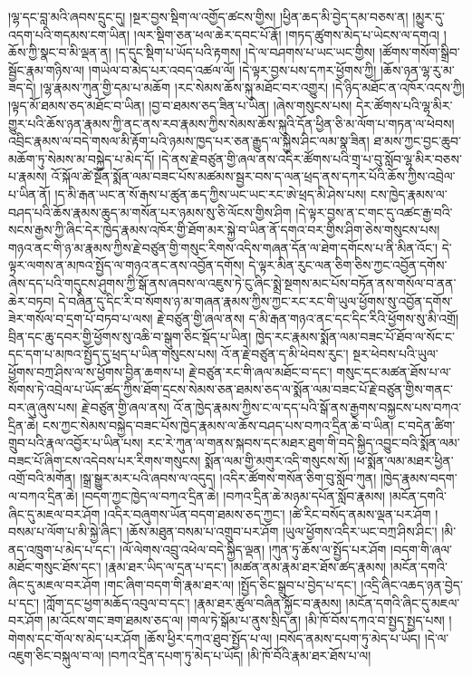 \documentclass{article}
\begin{document}
།ལྷ་དང་བླ་མའི་ཞབས་དྲུང་དུ། །སྔར་བྱས་སྡིག་ལ་འགྱོད་ཚངས་གྱིས། །ཕྱིན་ཆད་མི་བྱེད་དམ་བཅས་ན། །མྱུར་དུ་འདག་པའི་གདམས་ངག་ཡིན། །ལར་སྡིག་ཅན་ཕལ་ཆེར་དབང་པོ་རྣོ། །གཏད་ཚུགས་མེད་པ་ཡེངས་ལ་དགའ། །ཆོས་ཀྱི་སྣང་བ་མི་ལྡན་ན། །ད་དུང་སྡིག་པ་ཡོད་པའི་རྟགས། །དེ་ལ་བཤགས་པ་ཡང་ཡང་གྱིས། །ཚོགས་གསོག་སྒྲིབ་སྦྱོང་རྣམ་གཉིས་ལ། །གཡེལ་བ་མེད་པར་འབད་འཚལ་ལོ། །དེ་ལྟར་བྱས་པས་དཀར་ཕྱོགས་ཀྱི། །ཆོས་ཉན་ལྷ་རུ་མ་ཟད་དེ། །ལྷ་རྣམས་ཀུན་གྱི་དམ་པ་མཆོག །རང་སེམས་ཆོས་སྐུ་མཐོང་བར་འགྱུར། །དེ་ཉིད་མཐོང་ན་འཁོར་འདས་ཀྱི། །ལྟད་མོ་ཐམས་ཅད་མཐོང་བ་ཡིན། །བྱ་བ་ཐམས་ཅད་ཟིན་པ་ཡིན། །ཞེས་གསུངས་པས། དེར་ཚོགས་པའི་ལྷ་མིར་གྱུར་པའི་ཆོས་ཉན་རྣམས་ཀྱི་ནང་ནས་རབ་རྣམས་ཀྱིས་སེམས་ཆོས་སྐུའི་དོན་ཕྱིན་ཅི་མ་ལོག་པ་གཏན་ལ་ཕེབས། འབྲིང་རྣམས་ལ་བདེ་གསལ་མི་རྟོག་པའི་ཉམས་ཁྱད་པར་ཅན་རྒྱུད་ལ་སྐྱེས་ཤིང་ལམ་སྣ་ཟིན། ཐ་མས་ཀྱང་བྱང་ཆུབ་མཆོག་ཏུ་སེམས་མ་བསྐྱེད་པ་མེད་དོ། །དེ་ནས་རྗེ་བཙུན་གྱི་ཞལ་ནས་འདིར་ཚོགས་པའི་གྲྭ་པ་བུ་སློབ་ལྷ་མིར་བཅས་པ་རྣམས། འོ་སྐོལ་ཚེ་སྔོན་སྨོན་ལམ་བཟང་པོས་མཚམས་སྦྱར་བས་ད་ལན་ཕྲད་ནས་དཀར་པོའི་ཆོས་ཀྱིས་འབྲེལ་པ་ཡིན་ནོ། །ད་མི་རྒན་ཡང་ན་སོ་རྒས་པ་ཚུན་ཆད་ཀྱིས་ཡང་ཡང་རང་ཨེ་ཕྲད་མི་ཤེས་པས། ངས་ཁྱེད་རྣམས་ལ་བཤད་པའི་ཆོས་རྣམས་ཆུད་མ་གསོན་པར་ཉམས་སུ་ཅི་ལོངས་གྱིས་ཤིག །དེ་ལྟར་བྱས་ན་ང་གང་དུ་འཚང་རྒྱ་བའི་སངས་རྒྱས་ཀྱི་ཞིང་དེར་ཁྱེད་རྣམས་འཁོར་གྱི་ཐོག་མར་སྐྱེ་བ་ཡིན་ནོ་དགའ་བར་གྱིས་ཤིག་ཅེས་གསུངས་པས། གཉའ་ནང་གི་ཉ་མ་རྣམས་ཀྱིས་རྗེ་བཙུན་གྱི་གསུང་རིགས་འདིས་གཞན་དོན་ལ་ཐེག་དགོངས་པ་ནི་མིན་འོང་། དེ་ལྟར་ལགས་ན་མཁའ་སྤྱོད་ལ་གཉའ་ནང་ནས་འབྱོན་དགོས། དེ་ལྟར་མིན་རུང་ལན་ཅིག་ཅིས་ཀྱང་འབྱོན་དགོས་ཞེས་དད་པའི་གདུངས་ཤུགས་ཀྱི་སྒོ་ནས་ཞབས་ལ་འཇུས་ཏེ་ངུ་ཞིང་སྨྲེ་སྔགས་མང་པོས་བཏོན་ནས་གསོལ་བ་ནན་ཆེར་བཏབ། དེ་བཞིན་དུ་དིང་རི་བ་སོགས་ཉ་མ་གཞན་རྣམས་ཀྱིས་ཀྱང་རང་རང་གི་ཡུལ་ཕྱོགས་སུ་འབྱོན་དགོས་ཟེར་གསོལ་བ་དྲག་པོ་བཏབ་པ་ལས། རྗེ་བཙུན་གྱི་ཞལ་ནས། ད་མི་རྒན་གཉའ་ནང་དང་དིང་རིའི་ཕྱོགས་སུ་མི་འགྲོ། བྲིན་དང་ཆུ་དབར་གྱི་ཕྱོགས་སུ་འཆི་བ་སྒུག་ཅིང་སྡོད་པ་ཡིན། ཁྱེད་རང་རྣམས་སྨོན་ལམ་བཟང་པོ་ཐོབ་ལ་སོང་ང་དང་དག་པ་མཁའ་སྤྱོད་དུ་ཕྲད་པ་ཡིན་གསུངས་པས། འོ་ན་རྗེ་བཙུན་ད་མི་ཕེབས་རུང་། སྔར་ཕེབས་པའི་ཡུལ་ཕྱོགས་བཀྲ་ཤིས་ལ་ས་ཕྱོགས་བྱིན་ཆགས་པ། རྗེ་བཙུན་རང་གི་ཞལ་མཐོང་བ་དང་། གསུང་དང་མཚན་ཐོས་པ་ལ་སོགས་ཏེ་འབྲེལ་པ་ཡོད་ཚད་ཀྱིས་ཐོག་དྲངས་སེམས་ཅན་ཐམས་ཅད་ལ་སྨོན་ལམ་བཟང་པོ་རྗེ་བཙུན་གྱིས་གནང་བར་ཞུ་ཞུས་པས། རྗེ་བཙུན་གྱི་ཞལ་ནས། འོ་ན་ཁྱེད་རྣམས་ཀྱིས་ང་ལ་དད་པའི་སྒོ་ནས་རྒྱགས་བསྐྱངས་པས་བཀའ་དྲིན་ཆེ། ངས་ཀྱང་སེམས་བསྐྱེད་བཟང་པོས་ཁྱེད་རྣམས་ལ་ཆོས་བཤད་པས་བཀའ་དྲིན་ཆེ་བ་ཡིན། ང་བདེན་ཚིག་གྲུབ་པའི་རྣལ་འབྱོར་པ་ཡིན་པས། རང་རེ་ཀུན་ལ་གནས་སྐབས་དང་མཐར་ཐུག་གི་བདེ་སྐྱིད་འབྱུང་བའི་སྨོན་ལམ་བཟང་པོ་ཞིག་ངས་འདེབས་པར་རིགས་གསུངས། སྨོན་ལམ་གྱི་མགུར་འདི་གསུངས་སོ། །ཕ་སྨོན་ལམ་མཐར་ཕྱིན་འགྲོ་བའི་མགོན། །སྒྲ་སྒྱུར་མར་པའི་ཞབས་ལ་འདུད། །འདིར་ཚོགས་གསོན་ཅིག་བུ་སློབ་ཀུན། །ཁྱེད་རྣམས་བདག་ལ་བཀའ་དྲིན་ཆེ། །བདག་ཀྱང་ཁྱེད་ལ་བཀའ་དྲིན་ཆེ། །བཀའ་དྲིན་ཆེ་མཉམ་དཔོན་སློབ་རྣམས། །མངོན་དགའི་ཞིང་དུ་མཇལ་བར་ཤོག །འདིར་བཞུགས་ཡོན་བདག་ཐམས་ཅད་ཀྱང་། །ཚེ་རིང་བསོད་ནམས་ལྡན་པར་ཤོག །བསམ་པ་ལོག་པ་མི་སྐྱེ་ཞིང་། །ཆོས་མཐུན་བསམ་པ་འགྲུབ་པར་ཤོག །ཡུལ་ཕྱོགས་འདིར་ཡང་བཀྲ་ཤིས་ཤིང་། །མི་ནད་འཁྲུག་པ་མེད་པ་དང་། །ལོ་ལེགས་འབྲུ་འཕེལ་བདེ་སྐྱིད་ལྡན། །ཀུན་ཏུ་ཆོས་ལ་སྤྱོད་པར་ཤོག །བདག་གི་ཞལ་མཐོང་གསུང་ཐོས་དང་། །རྣམ་ཐར་ཡིད་ལ་དྲན་པ་དང་། །མཚན་ནམ་རྣམ་ཐར་ཐོས་ཚད་རྣམས། །མངོན་དགའི་ཞིང་དུ་མཇལ་བར་ཤོག །གང་ཞིག་བདག་གི་རྣམ་ཐར་ལ། །སྤྱོད་ཅིང་སྒྲུབ་པ་བྱེད་པ་དང་། །འདྲི་ཞིང་འཆད་ཉན་བྱེད་པ་དང་། །ཀློག་དང་ཕྱག་མཆོད་འབུལ་བ་དང་། །རྣམ་ཐར་ཚུལ་བཞིན་སྐྱོང་བ་རྣམས། །མངོན་དགའི་ཞིང་དུ་མཇལ་བར་ཤོག །མ་འོངས་གང་ཟག་ཐམས་ཅད་ལ། །གལ་ཏེ་སྒོམ་པ་ནུས་སྲིད་ན། །མི་ཁོ་བོས་དཀའ་བ་སྤྱད་སྤྱད་པས། །གེགས་དང་གོལ་ས་མེད་པར་ཤོག །ཆོས་ཕྱིར་དཀའ་ཐུབ་སྤྱོད་པ་ལ། །བསོད་ནམས་དཔག་ཏུ་མེད་པ་ཡོད། །དེ་ལ་འཇུག་ཅིང་བསྐུལ་བ་ལ། །བཀའ་དྲིན་དཔག་ཏུ་མེད་པ་ཡོད། །མི་ཁོ་བོའི་རྣམ་ཐར་ཐོས་པ་ལ། 
\end{document}
